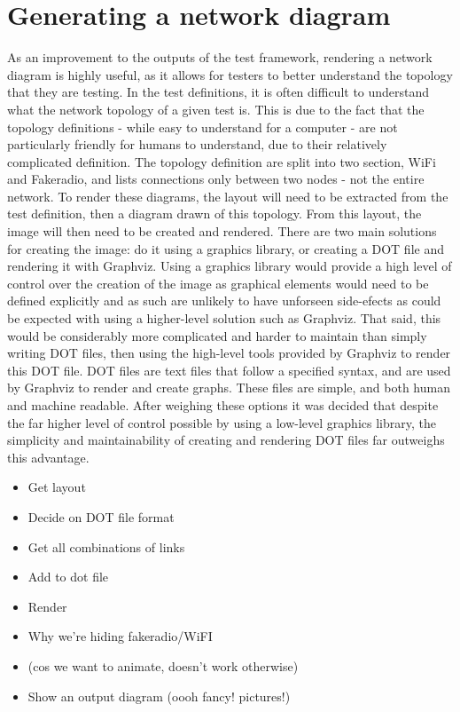 \section{Generating a network diagram}
As an improvement to the outputs of the test framework, rendering a network diagram is highly useful, as it allows for testers to better understand the topology that they are testing.
In the test definitions, it is often difficult to understand what the network topology of a given test is.
This is due to the fact that the topology definitions - while easy to understand for a computer - are not particularly friendly for humans to understand, due to their relatively complicated definition.
The topology definition are split into two section, WiFi and Fakeradio, and lists connections only between two nodes - not the entire network.
To render these diagrams, the layout will need to be extracted from the test definition, then a diagram drawn of this topology.
From this layout, the image will then need to be created and rendered.
There are two main solutions for creating the image: do it using a graphics library, or creating a DOT file and rendering it with Graphviz.
Using a graphics library would provide a high level of control over the creation of the image as graphical elements would need to be defined explicitly and as such are unlikely to have unforseen side-efects as could be expected with using a higher-level solution such as Graphviz.
That said, this would be considerably more complicated and harder to maintain than simply writing DOT files, then using the high-level tools provided by Graphviz to render this DOT file.
DOT files are text files that follow a specified syntax, and are used by Graphviz to render and create graphs.
These files are simple, and both human and machine readable. 
After weighing these options it was decided that despite the far higher level of control possible by using a low-level graphics library, the simplicity and maintainability of creating and rendering DOT files far outweighs this advantage.

\begin{itemize}
    \item Get layout
    \item Decide on DOT file format
    \item Get all combinations of links
    \item Add to dot file
    \item Render 
    \item Why we're hiding fakeradio/WiFI
    \item   (cos we want to animate, doesn't work otherwise)
    \item Show an output diagram (oooh fancy! pictures!)
\end{itemize}






